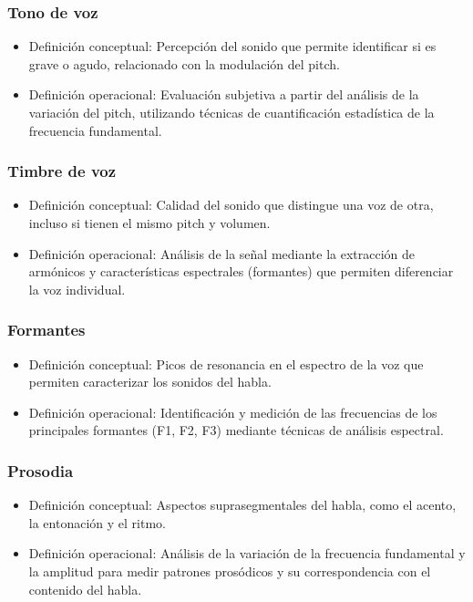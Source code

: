 \subsubsection{Tono de voz}

\begin{itemize}
	\item Definición conceptual: Percepción del sonido que permite identificar si es grave o agudo, relacionado con la modulación del pitch.
	\item Definición operacional: Evaluación subjetiva a partir del análisis de la variación del pitch, utilizando técnicas de cuantificación estadística de la frecuencia fundamental.
\end{itemize}

\subsubsection{Timbre de voz}

\begin{itemize}
	\item Definición conceptual: Calidad del sonido que distingue una voz de otra, incluso si tienen el mismo pitch y volumen.
	\item Definición operacional: Análisis de la señal mediante la extracción de armónicos y características espectrales (formantes) que permiten diferenciar la voz individual.
\end{itemize}

\subsubsection{Formantes}

\begin{itemize}
	\item Definición conceptual: Picos de resonancia en el espectro de la voz que permiten caracterizar los sonidos del habla.
	\item Definición operacional: Identificación y medición de las frecuencias de los principales formantes (F1, F2, F3) mediante técnicas de análisis espectral.
\end{itemize}

\subsubsection{Prosodia}

\begin{itemize}
	\item Definición conceptual: Aspectos suprasegmentales del habla, como el acento, la entonación y el ritmo.
	\item Definición operacional: Análisis de la variación de la frecuencia fundamental y la amplitud para medir patrones prosódicos y su correspondencia con el contenido del habla.
\end{itemize}

